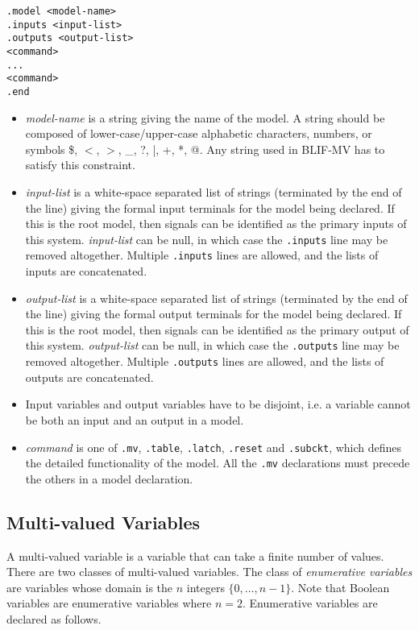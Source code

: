 \begin{verbatim}
.model <model-name>
.inputs <input-list>
.outputs <output-list>
<command>
...
<command>
.end
\end{verbatim}

\begin{itemize}
\item {\em model-name} is a string giving the name of the model.
A string should be composed of
lower-case/upper-case alphabetic characters, numbers,
or symbols \$, $<$, $>$, \_, ?, |, +, *, @.
Any string used in BLIF-MV has to satisfy this constraint.
\item {\em input-list} is a white-space separated list of strings
(terminated by the end of the line)
giving the formal input terminals for the model being declared.
If this is the root model,
then signals can be identified as the primary inputs of this system.
{\em input-list} can be null,
in which case the {\tt .inputs} line may be removed altogether.
Multiple {\tt .inputs} lines are allowed,
and the lists of inputs are concatenated.
\item {\em output-list} is a white-space separated list of strings
(terminated by the end of the line)
giving the formal output terminals for the model being declared.
If this is the root model,
then signals can be identified as the primary output of this system.
{\em output-list} can be null,
in which case the {\tt .outputs} line may be removed altogether.
Multiple {\tt .outputs} lines are allowed,
and the lists of outputs are concatenated.
\item Input variables and output variables have to be disjoint,
i.e. a variable cannot be both an input and an output in a model.
\item {\em command} is one of
{\tt .mv}, {\tt .table}, {\tt .latch}, {\tt .reset} and
{\tt .subckt},
which defines the detailed functionality of the model.
All the {\tt .mv} declarations must precede
the others in a model declaration.
\end{itemize}

\subsection{Multi-valued Variables}
A multi-valued variable is a variable that can take
a finite number of values.
There are two classes of multi-valued variables.
The class of {\em enumerative variables}
are variables whose domain is the
$n$ integers
$\{0,\ldots,n-1\}$.
Note that Boolean variables are enumerative variables where $n=2$.
Enumerative variables
are declared as follows.

